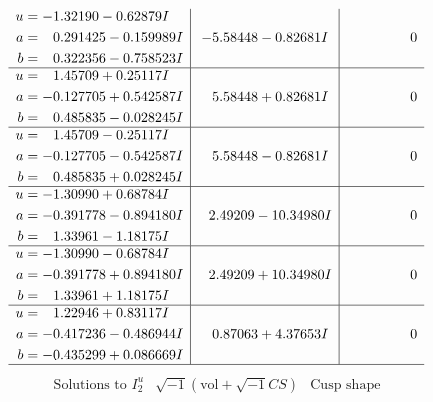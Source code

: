 \documentclass[1p]{elsarticle_modified}
\theoremstyle{definition}
\newcommand{\I}{\sqrt{-1}}
\begin{document}
$$\begin{array}{c|c|c}
\begin{aligned}
u &= -1.32190 - 0.62879 I \\
a &= \phantom{-}0.291425 - 0.159989 I \\
b &= \phantom{-}0.322356 - 0.758523 I\end{aligned}
 & -5.58448 - 0.82681 I & \phantom{-0.000000 } 0 \\ \hline\begin{aligned}
u &= \phantom{-}1.45709 + 0.25117 I \\
a &= -0.127705 + 0.542587 I \\
b &= \phantom{-}0.485835 - 0.028245 I\end{aligned}
 & \phantom{-}5.58448 + 0.82681 I & \phantom{-0.000000 } 0 \\ \hline\begin{aligned}
u &= \phantom{-}1.45709 - 0.25117 I \\
a &= -0.127705 - 0.542587 I \\
b &= \phantom{-}0.485835 + 0.028245 I\end{aligned}
 & \phantom{-}5.58448 - 0.82681 I & \phantom{-0.000000 } 0 \\ \hline\begin{aligned}
u &= -1.30990 + 0.68784 I \\
a &= -0.391778 - 0.894180 I \\
b &= \phantom{-}1.33961 - 1.18175 I\end{aligned}
 & \phantom{-}2.49209 - 10.34980 I & \phantom{-0.000000 } 0 \\ \hline\begin{aligned}
u &= -1.30990 - 0.68784 I \\
a &= -0.391778 + 0.894180 I \\
b &= \phantom{-}1.33961 + 1.18175 I\end{aligned}
 & \phantom{-}2.49209 + 10.34980 I & \phantom{-0.000000 } 0 \\ \hline\begin{aligned}
u &= \phantom{-}1.22946 + 0.83117 I \\
a &= -0.417236 - 0.486944 I \\
b &= -0.435299 + 0.086669 I\end{aligned}
 & \phantom{-}0.87063 + 4.37653 I & \phantom{-0.000000 } 0\\
 \hline 
 \end{array}$$\newpage$$\begin{array}{c|c|c}  
\text{Solutions to }I^u_{2}& \I (\text{vol} + \sqrt{-1}CS) & \text{Cusp shape}\\
 \hline 
\begin{aligned}

\end{aligned}
\end{array}$$
\end{document}
